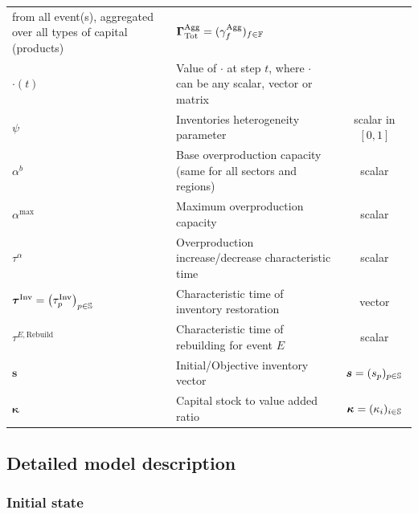 \documentclass[main.tex]{subfiles}
\begin{document}
{\begin{table}[H]
\begin{tabularx}{\linewidth}{
      p{4.5cm}Xc
      }
                                                from all event(s), aggregated
                                                over all types of capital (products) &
                                                                                      $\mathbf{\Gamma}^{\textrm{Agg}}_{\textrm{Tot}}
                                                                                      =
                                                                                      (\gamma^{\textrm{Agg}}_{f})_{f
                                                                                      \in
                                                                                      \mathbb{F}}$\\
      $\cdot(t)$ & Value of $\cdot$ at step $t$, where $\cdot$ can be any scalar, vector or matrix & \\
      $\psi$ & Inventories heterogeneity parameter & scalar in $[0,1]$ \\
      $\alpha^b$ & Base overproduction capacity (same for all sectors and regions) & scalar \\
      $\alpha^{\textrm{max}}$ & Maximum overproduction capacity & scalar \\
      $\tau^{\alpha}$ & Overproduction increase/decrease characteristic time &
                                                                               scalar \\
      $\bm{\tau}^{\textrm{Inv}} = \left( \tau^{\textrm{Inv}}_p \right )_{p \in \mathbb{S}}$ & Characteristic time of inventory restoration & vector \\
      $\tau^{E,\textrm{Rebuild}}$ & Characteristic time of rebuilding for event $E$ & scalar \\
      $\bm{s}$ & Initial/Objective inventory vector & $\bm{s} = (s_{p})_{p \in \mathbb{S}}$ \\
      $\bm{\kappa}$ & Capital stock to value added ratio & $\bm{\kappa} = (\kappa_{i})_{i \in \mathbb{S}}$ \\
      \bottomrule
    \end{tabularx}
  \end{table}
}

\subsection{Detailed model description}
\label{sec:deta-model-descr}

\subsubsection{Initial state}
\label{par:init_sh}
\end{document}
